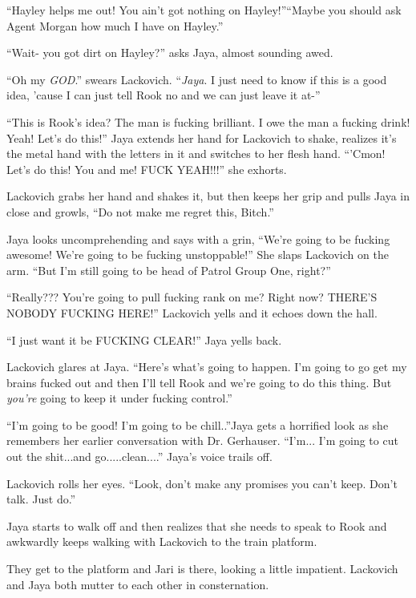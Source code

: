 ``Hayley helps me out!  You ain't got nothing on Hayley!''``Maybe you should ask Agent Morgan how much I have on Hayley.''

``Wait- you got dirt on Hayley?'' asks Jaya, almost sounding awed.

``Oh my \textit{GOD}.'' swears Lackovich.  ``\textit{Jaya}.  I just need to know if this is a good idea, 'cause I can just tell Rook no and we can just leave it at-''

``This is Rook's idea?  The man is fucking brilliant.  I owe the man a fucking drink!  Yeah!  Let's do this!''  Jaya extends her hand for Lackovich to shake, realizes it's the metal hand with the letters in it and switches to her flesh hand.  ``'Cmon!  Let's do this!  You and me!  FUCK YEAH!!!'' she exhorts.

Lackovich grabs her hand and shakes it, but then keeps her grip and pulls Jaya in close and growls, ``Do not make me regret this, Bitch.''

Jaya looks uncomprehending and says with a grin, ``We're going to be fucking awesome!  We're going to be fucking unstoppable!''  She slaps Lackovich on the arm.  ``But I'm still going to be head of Patrol Group One, right?'' 

``Really??? You're going to pull fucking rank on me?  Right now? THERE'S NOBODY FUCKING HERE!'' Lackovich yells and it echoes down the hall.

``I just want it be FUCKING CLEAR!'' Jaya yells back.

Lackovich glares at Jaya.  ``Here's what's going to happen.  I'm going to go get my brains fucked out and then I'll tell Rook and we're going to do this thing.  But \textit{you're} going to keep it under fucking control.''

``I'm going to be good!  I'm going to be chill..''Jaya gets a horrified look as she remembers her earlier conversation with Dr. Gerhauser.  ``I'm... I'm going to cut out the shit...and go.....clean....''  Jaya's voice trails off.

Lackovich rolls her eyes.  ``Look, don't make any promises you can't keep.   Don't talk.  Just do.''

Jaya starts to walk off and then realizes that she needs to speak to Rook and awkwardly keeps walking with Lackovich to the train platform.



They get to the platform and Jari is there, looking a little impatient.  Lackovich and Jaya both mutter to each other in consternation.

